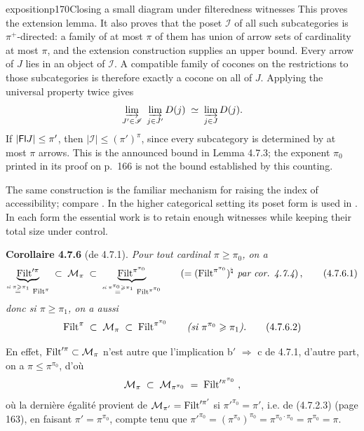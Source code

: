 \begin{dcomment}{exposition}{p170}{Closing a small diagram under filteredness witnesses}
This proves the extension lemma. It also proves that the poset $\mathscr I$ of all such subcategories is $\pi^+$-directed: a family of at most $\pi$ of them has union of arrow sets of cardinality at most $\pi$, and the extension construction supplies an upper bound. Every arrow of $J$ lies in an object of $\mathscr I$. A compatible family of cocones on the restrictions to those subcategories is therefore exactly a cocone on all of $J$. Applying the universal property twice gives
\[
 \varinjlim_{J'\in\mathscr I}\ \varinjlim_{j\in J'}D(j)
 \;\simeq\;\varinjlim_{j\in J}D(j).
\]
If $|\mathsf{Fl} J|\leq\pi'$, then $|\mathscr I|\leq(\pi')^\pi$, since every subcategory is determined by at most $\pi$ arrows. This is the announced bound in Lemma 4.7.3; the exponent $\pi_0$ printed in its proof on p.~166 is not the bound established by this counting.

The same construction is the familiar mechanism for raising the index of accessibility; compare \citet[Theorem 3.4]{Vasey2020Accessible}. In the higher categorical setting its poset form is used in \citet[Lemma 5.4.2.8 and Proposition 5.4.2.9]{Lurie2009HTT}. In each form the essential work is to retain enough witnesses while keeping their total size under control.
\end{dcomment}


\textbf{Corollaire 4.7.6} (de 4.7.1). \textit{Pour tout cardinal $\pi \geqslant \pi_0$, on a}
\[
\underbrace{\Filt'^{\pi}}_{\overset{\textit{si } \pi \geqslant \pi_1}{=}\ \Filt^{\pi}} \;\subset\; \mathcal{M}_{\pi} \;\subset\; \underbrace{\Filt^{\pi^{\pi_0}}}_{\overset{\textit{si } \pi^{\pi_0} \geqslant \pi_1}{=}\ \Filt^{\pi^{\pi_0}}} \qquad (= (\Filt^{\pi^{\pi_0}})^{\natural} \textit{ par cor. 4.7.4})\,, \tag*{(4.7.6.1)} %
\]
\textit{donc si $\pi \geqslant \pi_1$, on a aussi}
\[
\Filt^{\pi} \;\subset\; \mathcal{M}_{\pi} \;\subset\; \Filt^{\pi^{\pi_0}} \qquad \textit{(si $\pi^{\pi_0} \geqslant \pi_1$).} \tag*{(4.7.6.2)}
\]

En effet, $\mathrm{Filt}'^{\pi} \subset \mathcal{M}_{\pi}$ n’est autre que l’implication b$'$ $\Longrightarrow$ c de 4.7.1, d’autre part, on a $\pi \leqslant \pi^{\pi_0}$, d’où
\[
\mathcal{M}_{\pi} \;\subset\; \mathcal{M}_{\pi^{\pi_0}} \;=\; \mathrm{Filt}'^{\pi^{\pi_0}} \;,
\]
où la dernière égalité provient de $\mathcal{M}_{\pi'} = \mathrm{Filt}'^{\pi'}$ si $\pi'^{\pi_0} = \pi'$, i.e. de (4.7.2.3) (page 163), en faisant $\pi' = \pi^{\pi_0}$, compte tenu que $\pi'^{\pi_0} = (\pi^{\pi_0})^{\pi_0} = \pi^{\pi_0 \cdot \pi_0} = \pi^{\pi_0} = \pi$.


